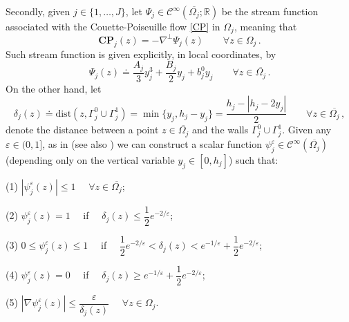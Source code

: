 \documentclass[11pt]{article}
\numberwithin{equation}{section}
\numberwithin{figure}{section}
\begin{document}
Secondly, given $j \in \{1,\dots, J\}$, let $\Psi_{j} \in \mathcal{C}^{\infty}(\overline{\Omega_{j}};\mathbb{R})$ be the stream function associated with the Couette-Poiseuille flow \eqref{CP} in $\Omega_{j}$, meaning that
\begin{equation}\label{str-p1}
\mathbf{CP}_{j}(z) = - \nabla^{\perp} \Psi_{j}(z) \qquad \forall z \in \Omega_{j} \, .
\end{equation}
Such stream function is given explicitly, in local coordinates, by
\begin{equation}\label{str-p2}
	\Psi_j(z) \doteq \frac{A_j}{3} y_{j}^3 + \frac{B_j}{2} y_{j} + b_j^0 y_{j} \qquad \forall z \in \overline{\Omega_{j}} \, .
\end{equation}
On the other hand, let
$$
\delta_{j}(z) \doteq \text{dist}(z, \Gamma^{0}_{j} \cup \Gamma^{1}_{j}) = \min \{y_{j}, h_{j} - y_{j} \} = \dfrac{h_{j} - | h_{j} - 2y_{j} |}{2} \qquad \forall z \in \overline{\Omega_{j}} \, ,
$$
denote the distance between a point $z \in \overline{\Omega_{j}}$ and the walls $\Gamma^{0}_{j} \cup \Gamma^{1}_{j}$. Given any
$\varepsilon \in (0,1]$, as in \cite[Lemma III.6.2]{galdi2011introduction} (see also \cite[Lemma 1]{kravcmar2001weak}) we can construct a
scalar function $\psi_{j}^{\varepsilon} \in \mathcal{C}^{\infty}(\overline{\Omega_{j}})$ (depending only on the vertical variable
$y_{j} \in [0,h_{j}]$) such that:\par
(1) $ | \psi_{j}^{\varepsilon}(z) | \leq 1$ \ \ $\forall z \in \overline{\Omega_{j}} $;

(2) $\psi_{j}^{\varepsilon}(z) = 1$ \ \ if \ \ $\delta_{j}(z) \leq \dfrac{1}{2} e^{-2/\varepsilon}$;
	
(3) $0 \le \psi_{j}^{\varepsilon}(z) \le 1$ \ \ if \ \ $\dfrac{1}{2} e^{-2/\varepsilon} < \delta_{j}(z) < e^{-1/\varepsilon} + \dfrac{1}{2} e^{-2/\varepsilon}$;
	
(4) $\psi_{j}^{\varepsilon}(z) = 0$ \ \ if \ \ $\delta_{j}(z) \geq e^{-1/\varepsilon} + \dfrac{1}{2} e^{-2/\varepsilon}$;
	
(5) $ | \nabla \psi_{j}^{\varepsilon}(z) | \leq \dfrac{\varepsilon}{\delta_{j}(z)}$  \ \ $\forall z \in \Omega_{j}$.
\end{document}
